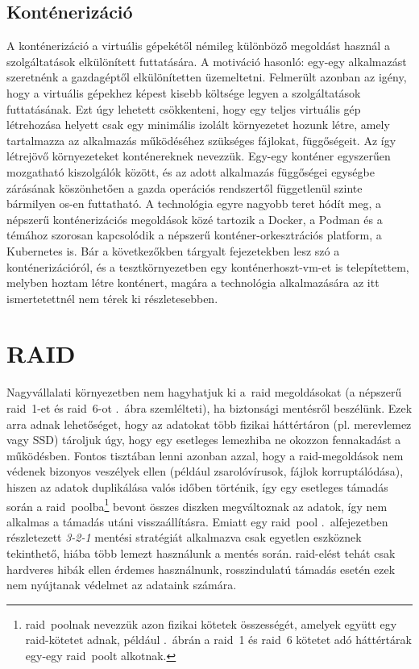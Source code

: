 \subsection{Konténerizáció}
A konténerizáció a virtuális gépekétől némileg különböző megoldást használ a szolgáltatások elkülönített futtatására. A motiváció hasonló: egy-egy alkalmazást szeretnénk a gazdagéptől elkülönítetten üzemeltetni. Felmerült azonban az igény, hogy a virtuális gépekhez képest kisebb költsége legyen a szolgáltatások futtatásának. Ezt úgy lehetett csökkenteni, hogy egy teljes virtuális gép létrehozása helyett csak egy minimális izolált környezetet hozunk létre, amely tartalmazza az alkalmazás működéséhez szükséges fájlokat, függőségeit. Az így létrejövő környezeteket konténereknek nevezzük. Egy-egy konténer egyszerűen mozgatható kiszolgálók között, és az adott alkalmazás függőségei egységbe zárásának köszönhetően a gazda operációs rendszertől függetlenül szinte bármilyen \acrshort{os}-en futtatható. A technológia egyre nagyobb teret hódít meg, a népszerű konténerizációs megoldások közé tartozik a Docker, a Podman és a témához szorosan kapcsolódik a népszerű konténer-orkesztrációs platform, a Kubernetes is. Bár a következőkben tárgyalt fejezetekben lesz szó a konténerizációról, és a tesztkörnyezetben egy konténerhoszt-\acrshort{vm}-et is telepítettem, melyben hoztam létre konténert, magára a technológia alkalmazására az itt ismertetettnél nem térek ki részletesebben.

\section{RAID}
\label{sect:raid}
Nagyvállalati környezetben nem hagyhatjuk ki a~\acrfull{raid} megoldásokat (a népszerű \acrshort{raid}~1-et és \acrshort{raid}~6-ot .~ábra szemlélteti), ha biztonsági mentésről beszélünk. Ezek arra adnak lehetőséget, hogy az adatokat több fizikai háttértáron (pl. merevlemez vagy SSD) tároljuk úgy, hogy egy esetleges lemezhiba ne okozzon fennakadást a működésben. Fontos tisztában lenni azonban azzal, hogy a \acrshort{raid}-megoldások nem védenek bizonyos veszélyek ellen (például zsarolóvírusok, fájlok korruptálódása), hiszen az adatok duplikálása valós időben történik, így egy esetleges támadás során a \acrshort{raid}~poolba\footnote{\acrshort{raid}~poolnak nevezzük azon fizikai kötetek összességét, amelyek együtt egy \acrshort{raid}-kötetet adnak, például .~ábrán a \acrshort{raid}~1 és \acrshort{raid}~6 kötetet adó háttértárak egy-egy \acrshort{raid}~poolt alkotnak.} bevont összes diszken megváltoznak az adatok, így nem alkalmas a támadás utáni visszaállításra. Emiatt egy \acrshort{raid}~pool .~alfejezetben részletezett \textit{3-2-1} mentési stratégiát alkalmazva csak egyetlen eszköznek tekinthető, hiába több lemezt használunk a mentés során. \acrshort{raid}-elést tehát csak hardveres hibák ellen érdemes használnunk, rosszindulatú támadás esetén ezek nem nyújtanak védelmet az adataink számára.

